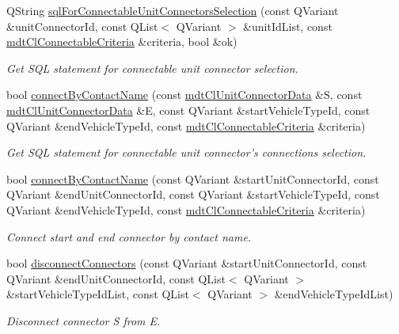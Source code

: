 \begin{DoxyCompactItemize}
Q\-String \hyperlink{classmdt_cl_link_ac96ea60e20a77705c17c4ff5ac4cabc0}{sql\-For\-Connectable\-Unit\-Connectors\-Selection} (const Q\-Variant \&unit\-Connector\-Id, const Q\-List$<$ Q\-Variant $>$ \&unit\-Id\-List, const \hyperlink{structmdt_cl_connectable_criteria}{mdt\-Cl\-Connectable\-Criteria} \&criteria, bool \&ok)
\begin{DoxyCompactList}\small\item\em Get S\-Q\-L statement for connectable unit connector selection. \end{DoxyCompactList}\item 
bool \hyperlink{classmdt_cl_link_aec1f9d1998591653e13e45aef0870d6c}{connect\-By\-Contact\-Name} (const \hyperlink{classmdt_cl_unit_connector_data}{mdt\-Cl\-Unit\-Connector\-Data} \&S, const \hyperlink{classmdt_cl_unit_connector_data}{mdt\-Cl\-Unit\-Connector\-Data} \&E, const Q\-Variant \&start\-Vehicle\-Type\-Id, const Q\-Variant \&end\-Vehicle\-Type\-Id, const \hyperlink{structmdt_cl_connectable_criteria}{mdt\-Cl\-Connectable\-Criteria} \&criteria)
\begin{DoxyCompactList}\small\item\em Get S\-Q\-L statement for connectable unit connector's connections selection. \end{DoxyCompactList}\item 
bool \hyperlink{classmdt_cl_link_a7dde293df588baf8c5d6ffaa2cbb9693}{connect\-By\-Contact\-Name} (const Q\-Variant \&start\-Unit\-Connector\-Id, const Q\-Variant \&end\-Unit\-Connector\-Id, const Q\-Variant \&start\-Vehicle\-Type\-Id, const Q\-Variant \&end\-Vehicle\-Type\-Id, const \hyperlink{structmdt_cl_connectable_criteria}{mdt\-Cl\-Connectable\-Criteria} \&criteria)
\begin{DoxyCompactList}\small\item\em Connect start and end connector by contact name. \end{DoxyCompactList}\item 
bool \hyperlink{classmdt_cl_link_ac32bfef9f23b431ea4d3d546e6c21361}{disconnect\-Connectors} (const Q\-Variant \&start\-Unit\-Connector\-Id, const Q\-Variant \&end\-Unit\-Connector\-Id, const Q\-List$<$ Q\-Variant $>$ \&start\-Vehicle\-Type\-Id\-List, const Q\-List$<$ Q\-Variant $>$ \&end\-Vehicle\-Type\-Id\-List)
\begin{DoxyCompactList}\small\item\em Disconnect connector S from E. \end{DoxyCompactList}\end{DoxyCompactItemize}
